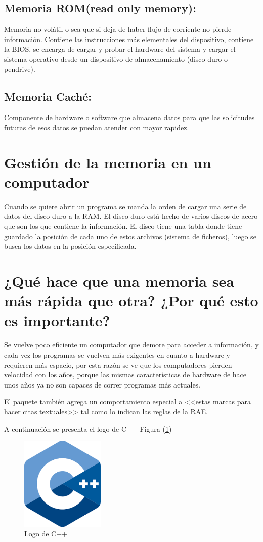 \documentclass{article}
\begin{document}
\subsection{Memoria ROM(read only memory):} 
Memoria no volátil o sea que si deja de haber flujo de corriente no pierde información. Contiene las instrucciones más elementales del dispositivo, contiene la BIOS, se encarga de cargar y probar el hardware del sistema y cargar el sistema operativo desde un dispositivo de almacenamiento (disco duro o pendrive).

\subsection{Memoria Caché: } 
Componente de hardware o software que almacena datos para que las solicitudes futuras de esos datos se puedan atender con mayor rapidez.

\section{Gestión de la memoria en un computador}
Cuando se quiere abrir un programa se manda la orden de cargar una serie de datos del disco duro a la RAM. El disco duro está hecho de varios discos de acero que son los que contiene la información. El disco tiene una tabla donde tiene guardado la posición de cada uno de estos archivos (sistema de ficheros), luego se busca los datos en la posición especificada.

\section{¿Qué hace que una memoria sea más rápida que otra? ¿Por qué esto es importante?}
Se vuelve poco eficiente un computador que demore para acceder a información, y cada vez los programas se vuelven más exigentes en cuanto a hardware y requieren más espacio, por esta razón se ve que los computadores pierden velocidad con los años, porque las mismas características de hardware de hace unos años ya no son capaces de correr programas más actuales.

El paquete también agrega un comportamiento especial 
a <<estas marcas para hacer citas textuales>> tal como 
lo indican las reglas de la RAE. \cite{knuthwebsite}

\vspace{5mm}

A continuación se presenta el logo de C++ Figura (\ref{fig:cpplogo})

\begin{figure}[h]
\includegraphics[width=4cm]{cpplogo.png}
\centering
\caption{Logo de C++}
\label{fig:cpplogo}
\end{figure}

\clearpage



\end{document}
